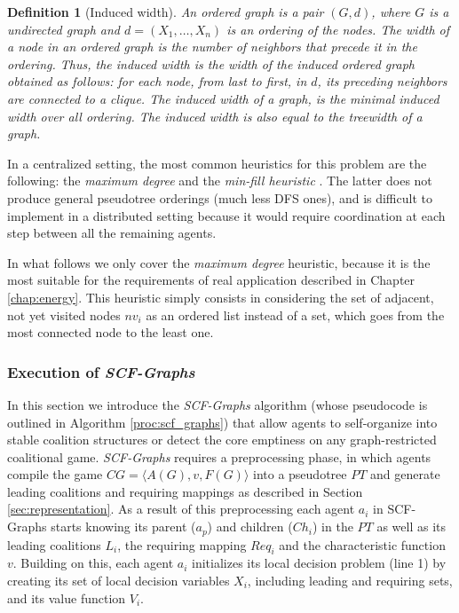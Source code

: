 \documentclass[11pt, twoside, titlepage, a4paper, openright]{report}
\newtheorem{Def}{Definition}
\begin{document}
\begin{Def}[Induced width]
An \textit{ordered graph} is a pair $(G,d)$, where $G$ is a undirected graph and $d=(X_1,\ldots,X_n)$ is an ordering of the nodes. The \textit{width} of a node in an ordered graph is the number of neighbors that precede it in the ordering.
Thus, the \textit{induced width} is the width of the induced ordered graph obtained as follows: for each node, from last to first, in $d$, its preceding neighbors are connected to a clique. The induced width of a graph, is the minimal induced width over all ordering. The induced width is also equal to the \textit{treewidth} of a graph.
\end{Def}

\noindent In a centralized setting, the most common heuristics for this problem are the following: the \textit{maximum degree} \cite{DBLP:journals/siamcomp/TarjanY85} and the \textit{min-fill heuristic} \cite{Kjaerulff_1990}. The latter does not produce general pseudotree orderings (much less DFS ones), and is difficult to implement in a distributed setting because it would require coordination at each step between all the remaining agents. 

\noindent In what follows we only cover the \textit{maximum degree} heuristic, because it is the most suitable for the requirements of real application described in Chapter \ref{chap:energy}. This heuristic simply consists in considering the set of adjacent, not yet visited nodes $nv_i$ as an ordered list instead of a set, which goes from the most connected node to the least one. 

\subsubsection{Execution of \textit{SCF-Graphs}}

In this section we introduce the \emph{SCF-Graphs} algorithm (whose pseudocode
is outlined in Algorithm \ref{proc:scf_graphs}) that allow agents to
self-organize into stable coalition structures or detect the core emptiness on
any graph-restricted coalitional game. \emph{SCF-Graphs} requires a
preprocessing phase, in which agents compile the game $CG=\langle
A(G),v,F(G)\rangle$ into a pseudotree $PT$ and generate leading coalitions and
requiring mappings as described in Section \ref{sec:representation}.
As a result of this preprocessing each agent $a_i$ in SCF-Graphs starts knowing
its parent ($a_p$) and children ($Ch_i$) in the $PT$ as well as its leading
coalitions $L_i$, the requiring mapping $Req_i$ and the characteristic function $v$.
Building on this, each agent $a_i$ initializes its local
decision problem (line 1) by creating its set of local decision variables $X_i$,
including leading and requiring sets, and its value function $V_i$.
\end{document}
